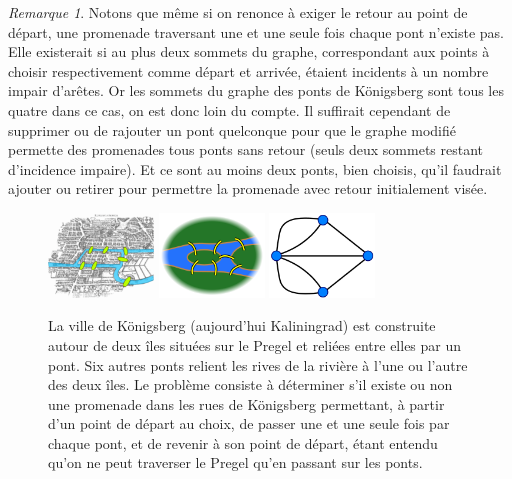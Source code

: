 \documentclass[a4paper,11pt]{article}
\theoremstyle{plain}
\theoremstyle{definition}
\theoremstyle{remark}
\newtheorem*{rmk}{Remarque}
\begin{document}
\begin{rmk}
Notons que même si on renonce à exiger le retour au point de départ, une promenade traversant une et une seule fois chaque pont n'existe pas. Elle existerait si au plus deux sommets du graphe, correspondant aux points à choisir respectivement comme départ et arrivée, étaient incidents à un nombre impair d'arêtes. Or les sommets du graphe des ponts de Königsberg sont tous les quatre dans ce cas, on est donc loin du compte. Il suffirait cependant de supprimer ou de rajouter un pont quelconque pour que le graphe modifié permette des promenades tous ponts sans retour (seuls deux sommets restant d'incidence impaire). Et ce sont au moins deux ponts, bien choisis, qu'il faudrait ajouter ou retirer pour permettre la promenade avec retour initialement visée.
\end{rmk}

\begin{figure}
\centering
\includegraphics[width=0.25\textwidth]{l}%
\hfill
\includegraphics[width=0.25\textwidth]{c}%
\hfill
\includegraphics[width=0.25\textwidth]{r}
%
\caption{La ville de Königsberg (aujourd'hui Kaliningrad) est construite autour de deux îles situées sur le Pregel et reliées entre elles par un pont. Six autres ponts relient les rives de la rivière à l'une ou l'autre des deux îles. Le problème consiste à déterminer s'il existe ou non une promenade dans les rues de Königsberg permettant, à partir d'un point de départ au choix, de passer une et une seule fois par chaque pont, et de revenir à son point de départ, étant entendu qu'on ne peut traverser le Pregel qu'en passant sur les ponts.}
\label{fig:Königsberg}
\end{figure}
\end{document}
